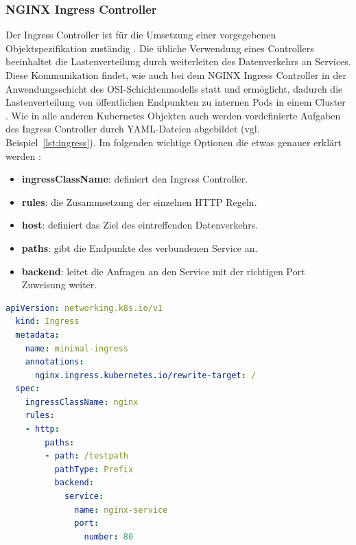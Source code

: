\subsubsection{NGINX Ingress Controller}
Der Ingress Controller ist für die Umsetzung einer vorgegebenen Objektspezifikation zuständig \cite{kubernetesingress}.
Die übliche Verwendung eines Controllers beeinhaltet die Lastenverteilung durch weiterleiten des Datenverkehrs an Services. 
Diese Kommunikation findet, wie auch bei dem NGINX Ingress Controller \cite{kubernetesingresscontrollerlayer} in der Anwendungsschicht des OSI-Schichtenmodells statt und ermöglicht, dadurch die 
Lastenverteilung von öffentlichen Endpunkten zu internen Pods in einem Cluster \cite{kubernetesingressibm}.
Wie in alle anderen Kubernetes Objekten auch werden vordefinierte Aufgaben des Ingress Controller durch YAML-Dateien abgebildet (vgl. Beispiel~\ref{lst:ingress}).
Im folgenden wichtige Optionen die etwas genauer erklärt werden \cite{kubernetesingress}:

\begin{itemize}
  \item \textbf{ingressClassName}: definiert den Ingress Controller.
  \item \textbf{rules}: die Zusammsetzung der einzelnen HTTP Regeln.
  \item \textbf{host}: definiert das Ziel des eintreffenden Datenverkehrs.
  \item \textbf{paths}: gibt die Endpunkte des verbundenen Service an.
  \item \textbf{backend}: leitet die Anfragen an den Service mit der richtigen Port Zuweisung weiter.
\end{itemize}

\begin{lstlisting}[caption={ingress.yaml \cite{kubernetesingress} },captionpos=b,label={lst:ingress},language=yaml]
  apiVersion: networking.k8s.io/v1
  kind: Ingress
  metadata:
    name: minimal-ingress
    annotations:
      nginx.ingress.kubernetes.io/rewrite-target: /
  spec:
    ingressClassName: nginx
    rules:
    - http:
        paths:
        - path: /testpath
          pathType: Prefix
          backend:
            service:
              name: nginx-service
              port:
                number: 80
  \end{lstlisting}
